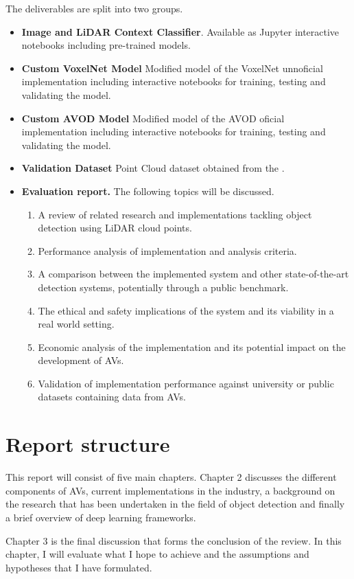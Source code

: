 The deliverables are split into two groups. 
\begin{itemize}
	 \item \textbf{Image and LiDAR Context Classifier}. Available as Jupyter interactive notebooks including pre-trained models.  
	 \item \textbf{Custom VoxelNet Model} Modified model of the VoxelNet unnoficial implementation including interactive notebooks for training, testing and validating the model. 
	 \item \textbf{Custom AVOD Model} Modified model of the AVOD oficial implementation including interactive notebooks for training, testing and validating the model.
	 \item \textbf{Validation Dataset} Point Cloud dataset obtained  from the .
	  
	\item \textbf{Evaluation report.} The following topics will be discussed. 
	\begin{enumerate}
		\item A review of related research and implementations tackling object detection using LiDAR cloud points. 
		\item Performance analysis of implementation and analysis criteria.
		\item A comparison between the implemented system and other state-of-the-art detection systems, potentially through a public benchmark. 
		\item The ethical and safety implications of the system and its viability in a real world setting. 
		\item Economic analysis of the implementation and its potential impact on the development of AVs. 
		\item Validation of implementation performance against university or public datasets containing data from AVs. 
	\end{enumerate}
\end{itemize}

\section{Report structure}

This report will consist of five main chapters. 
Chapter 2 discusses the different components of AVs, current implementations in the industry, a background on the research that has been undertaken in the field of object detection and finally a brief overview of deep learning frameworks. 

Chapter 3 is the final discussion that forms the conclusion of the review. In this chapter, I will evaluate what I hope to achieve and the assumptions and hypotheses that I have formulated. 


